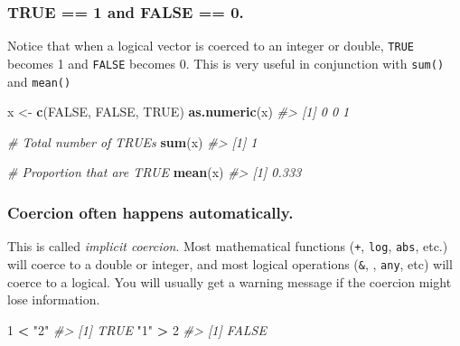 \documentclass[]{book}
\newenvironment{Shaded}{\begin{snugshade}}{\end{snugshade}}
\newcommand{\CommentTok}[1]{\textcolor[rgb]{0.56,0.35,0.01}{\textit{#1}}}
\newcommand{\DecValTok}[1]{\textcolor[rgb]{0.00,0.00,0.81}{#1}}
\newcommand{\KeywordTok}[1]{\textcolor[rgb]{0.13,0.29,0.53}{\textbf{#1}}}
\newcommand{\NormalTok}[1]{#1}
\newcommand{\OperatorTok}[1]{\textcolor[rgb]{0.81,0.36,0.00}{\textbf{#1}}}
\newcommand{\OtherTok}[1]{\textcolor[rgb]{0.56,0.35,0.01}{#1}}
\newcommand{\StringTok}[1]{\textcolor[rgb]{0.31,0.60,0.02}{#1}}
\begin{document}
\hypertarget{true-1-and-false-0.}{%
\subsubsection*{TRUE == 1 and FALSE == 0.}\label{true-1-and-false-0.}}

Notice that when a logical vector is coerced to an integer or double, \texttt{TRUE} becomes 1 and \texttt{FALSE} becomes 0. This is very useful in conjunction with \texttt{sum()} and \texttt{mean()}

\begin{Shaded}
\begin{Highlighting}[]
\NormalTok{x <-}\StringTok{ }\KeywordTok{c}\NormalTok{(}\OtherTok{FALSE}\NormalTok{, }\OtherTok{FALSE}\NormalTok{, }\OtherTok{TRUE}\NormalTok{)}
\KeywordTok{as.numeric}\NormalTok{(x)}
\CommentTok{#> [1] 0 0 1}

\CommentTok{# Total number of TRUEs}
\KeywordTok{sum}\NormalTok{(x)}
\CommentTok{#> [1] 1}

\CommentTok{# Proportion that are TRUE}
\KeywordTok{mean}\NormalTok{(x)}
\CommentTok{#> [1] 0.333}
\end{Highlighting}
\end{Shaded}

\hypertarget{coercion-often-happens-automatically.}{%
\subsubsection*{Coercion often happens automatically.}\label{coercion-often-happens-automatically.}}

This is called \emph{implicit coercion}. Most mathematical functions (\texttt{+}, \texttt{log}, \texttt{abs}, etc.) will coerce to a double or integer, and most logical operations (\texttt{\&}, \texttt{\textbar{}}, \texttt{any}, etc) will coerce to a logical. You will usually get a warning message if the coercion might lose information.

\begin{Shaded}
\begin{Highlighting}[]
\DecValTok{1} \OperatorTok{<}\StringTok{ "2"}
\CommentTok{#> [1] TRUE}
\StringTok{"1"} \OperatorTok{>}\StringTok{ }\DecValTok{2}
\CommentTok{#> [1] FALSE}
\end{Highlighting}
\end{Shaded}
\end{document}

